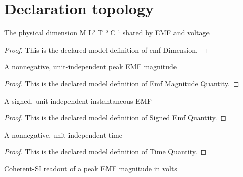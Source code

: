 \section{Declaration topology}
\begin{definition}
  \label{def:physics:phyx-mini-0886:phyxminiproblems-problemphyxmini0886-emfdimension}
  The physical dimension M L² T⁻² C⁻¹ shared by EMF and voltage
\end{definition}
\begin{proof}
  This is the declared model definition of emf Dimension.
\end{proof}
\begin{definition}
  \label{def:physics:phyx-mini-0886:phyxminiproblems-problemphyxmini0886-emfmagnitudequantity}
  A nonnegative, unit-independent peak EMF magnitude
\end{definition}
\begin{proof}
  This is the declared model definition of Emf Magnitude Quantity.
\end{proof}
\begin{definition}
  \label{def:physics:phyx-mini-0886:phyxminiproblems-problemphyxmini0886-signedemfquantity}
  A signed, unit-independent instantaneous EMF
\end{definition}
\begin{proof}
  This is the declared model definition of Signed Emf Quantity.
\end{proof}
\begin{definition}
  \label{def:physics:phyx-mini-0886:phyxminiproblems-problemphyxmini0886-timequantity}
  A nonnegative, unit-independent time
\end{definition}
\begin{proof}
  This is the declared model definition of Time Quantity.
\end{proof}
\begin{definition}
  \label{def:physics:phyx-mini-0886:phyxminiproblems-problemphyxmini0886-emfmagnitudeinvolts}
  Coherent-SI readout of a peak EMF magnitude in volts
\end{definition}
